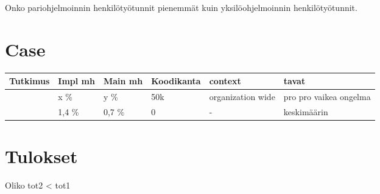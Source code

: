 \documentclass[finnish]{tktltiki2}
\theoremstyle{definition}
\theoremstyle{remark}
\begin{document}
Onko pariohjelmoinnin henkilötyötunnit pienemmät kuin yksilöohjelmoinnin henkilötyötunnit.


\section{Case}
\begin{center}
    \begin{tabular}{ | l | l | l | l | l | p{4cm} |}\hline
    Tutkimus & Impl mh & Main mh & Koodikanta & context & tavat \\ \hline
    	~\cite{case} & x \% & y \% & 50k & organization wide & pro pro vaikea ongelma \\ \hline
	~\cite{costandbenefit} & 1,4 \% & 0,7 \% & 0 & - & keskimäärin \\ \hline
    \end{tabular}
\end{center}

\section{Tulokset}
Oliko tot2 < tot1

\newpage

%
%
% 
%



\end{document}
